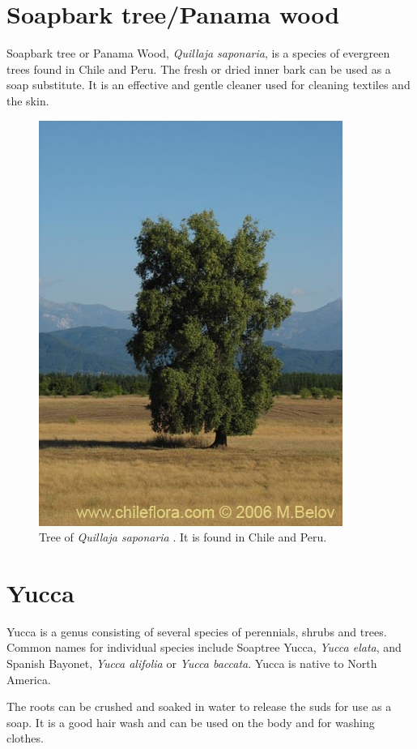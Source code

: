 \documentclass[a4paper]{article}
\begin{document}
\clearpage
\section{Soapbark tree/Panama wood}

Soapbark tree or Panama Wood, {\it Quillaja saponaria}, is a species of
evergreen trees found in Chile and Peru. 
The fresh or dried inner bark can be used as a soap substitute.
It is an effective and gentle cleaner used for cleaning textiles
and the skin. 

\begin{figure}[H]
\centering
\includegraphics{images/quillaja_saponaria_tree}
\caption{Tree of {\it Quillaja saponaria} \citep{Belov2006}.
         It is found in Chile and Peru.} 
\end{figure}

\clearpage
\section{Yucca}
Yucca is a genus consisting of several species of
perennials, shrubs and trees. Common names for individual species include
Soaptree Yucca, {\it Yucca elata}, and Spanish Bayonet, 
{\it Yucca alifolia} or {\it Yucca baccata}. Yucca is native to
North America.

The roots can be crushed and soaked in water to 
release the suds for use as a soap. It is a good 
hair wash and can be used on the body and for washing clothes.
\end{document}
